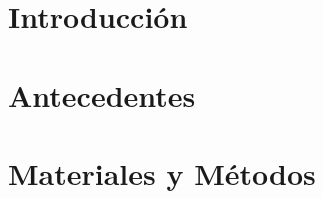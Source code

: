 \documentclass{beamer}
\title{\tituloTesis}
\author{Juan Manuel Pérez}
\begin{document}
\beamertemplatenavigationsymbolsempty


\frame{\titlepage}





\section{Introducción}



\section{Antecedentes}




\section{Materiales y Métodos}
\end{document}
